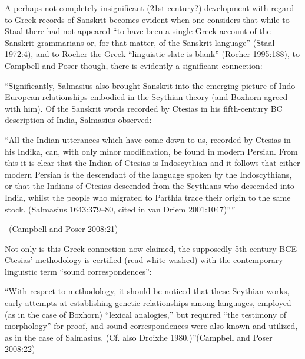 A perhaps not completely insignificant (21st century?) development with regard to Greek records of Sanskrit becomes evident when one considers that while to Staal there had not appeared “to have been a single Greek account of the Sanskrit grammarians or, for that matter, of the Sanskrit language” (Staal 1972:4), and to Rocher the Greek “linguistic slate is blank” (Rocher 1995:188), to Campbell and Poser though, there is evidently a significant connection:

\begin{myquote}
“Significantly, Salmasius also brought Sanskrit into the emerging picture of Indo-European relationships embodied in the Scythian theory (and Boxhorn agreed with him). Of the Sanskrit words recorded by Ctesias in his fifth-century BC description of India, Salmasius observed:
\end{myquote}

\begin{myquote}
“All the Indian utterances which have come down to us, recorded by Ctesias in his Indika, can, with only minor modification, be found in modern Persian. From this it is clear that the Indian of Ctesias is Indoscythian and it follows that either modern Persian is the descendant of the language spoken by the Indoscythians, or that the Indians of Ctesias descended from the Scythians who descended into India, whilst the people who migrated to Parthia trace their origin to the same stock. (Salmasius 1643:379–80, cited in van Driem 2001:1047)””

~\hfill (Campbell and Poser 2008:21)
\end{myquote}

Not only is this Greek connection now claimed, the supposedly 5th century BCE Ctesias’ methodology is certified (read white-washed) with the contemporary linguistic term “sound correspondences”:

\begin{myquote}
“With respect to methodology, it should be noticed that these Scythian works, early attempts at establishing genetic relationships among languages, employed (as in the case of Boxhorn) “lexical analogies,” but required “the testimony of morphology” for proof, and sound correspondences were also known and utilized, as in the case of Salmasius. (Cf. also Droixhe 1980.)”\hfill (Campbell and Poser 2008:22)
\end{myquote}

